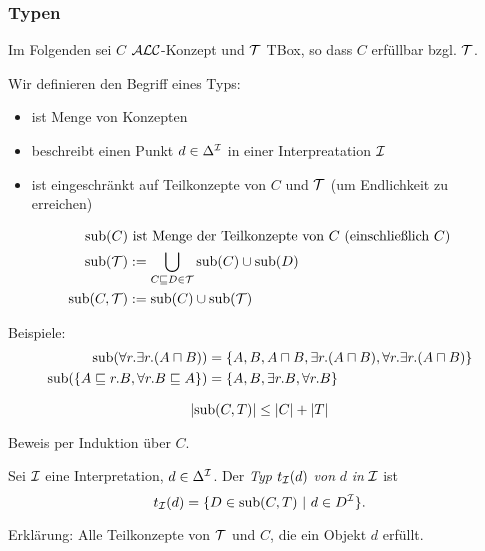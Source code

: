 \subsubsection{Typen}
\label{sec:typ}

Im Folgenden sei $C$ $\mathcal{A}\mathcal{L}\mathcal{C}$-Konzept und $\mathcal{T}$ TBox, so dass $C$ erfüllbar bzgl. $\mathcal{T}$.

Wir definieren den Begriff eines Typs:

\begin{itemize}
  \item ist Menge von Konzepten
  \item beschreibt einen Punkt $d \in \Delta^{\mathcal{I}}$ in einer Interpreatation $\mathcal{I}$
  \item ist eingeschränkt auf Teilkonzepte von $C$ und $\mathcal{T}$ (um Endlichkeit zu erreichen)
\end{itemize}

\begin{definition}[Teilkonzepte]
    \begin{align*}
        \operatorname{sub}(C)&\ \text{ist Menge der Teilkonzepte von $C$ (einschließlich $C$)}\\
        \operatorname{sub}(\mathcal{T})&:= \bigcup_{C \sqsubseteq D \in \mathcal{T}}\operatorname{sub}(C) \cup \operatorname{sub}( D) \\
        \operatorname{sub}(C,\mathcal{T})&:= \operatorname{sub}(C) \cup \operatorname{sub}( \mathcal{T})
    \end{align*}
\end{definition}

\begin{tafel}
Beispiele:
\begin{align*}
    \sub\left(\forall r.\exists r.(A \sqcap B)\right) &= \{A,B,A \sqcap B, \exists r.(A \sqcap B), \forall r.\exists r.(A \sqcap B)\}\\
    \sub\left(\{A \sqsubseteq r.B, \forall r.B \sqsubseteq A\}\right) &= \{A,B, \exists r.B, \forall r.B\}
\end{align*}
\end{tafel}

\begin{lemma}
    \label{lem:num-sub}
    \[ \left| \sub\left( C,T \right) \right| \leq \left| C \right| + \left| T \right| \]
\end{lemma}
Beweis per Induktion über $C$.

\begin{definition}
Sei $\mathcal{I}$ eine Interpretation, $d \in \Delta^{\mathcal{I}}$. Der \emph{Typ}
$t_\MI\left( d \right)$ \emph{von} $d$ \emph{in} $\mathcal{I}$ ist
\[ t_\MI\left( d \right) = \left\{ D \in \sub\left( C,T \right)\  \right|\ d \in D^\MI\}. \]
\end{definition}
Erklärung: Alle Teilkonzepte von $\mathcal{T}$ und $C$, die ein Objekt $d$
erfüllt.


